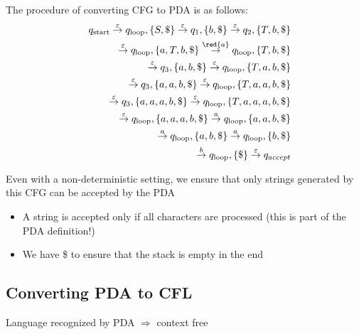 The procedure of converting CFG to PDA is as follows:
\begin{eqnarray*}
&& q_{\text{start}} \stackrel{\varepsilon}{\rightarrow}
q_{\text{loop}}, \{S,\$\} 
\stackrel{\varepsilon}{\rightarrow} q_1, \{b,\$\}
\stackrel{\varepsilon}{\rightarrow} q_2, \{T,b,\$\} \\
&& \stackrel{\varepsilon}{\rightarrow} q_{\text{loop}}, \{a,T,b,\$\} 
\stackrel{\red{a}}{\rightarrow}
 q_{\text{loop}}, \{T,b,\$\} \\
&& \stackrel{\varepsilon}{\rightarrow} q_{3}, \{a, b,\$\} 
\stackrel{\varepsilon}{\rightarrow} q_{\text{loop}}, \{T,a,b,\$\}\\
&& \stackrel{\varepsilon}{\rightarrow} q_3, \{a,a,b,\$\}
\stackrel{\varepsilon}{\rightarrow} q_{\text{loop}}, \{T,a,a,b,\$\}\\
&& \stackrel{\varepsilon}{\rightarrow} q_3, \{a,a,a,b,\$\}
\stackrel{\varepsilon}{\rightarrow} q_{\text{loop}}, \{T,a,a,a,b,\$\}\\
&& \stackrel{\varepsilon}{\rightarrow} q_{\text{loop}}, \{a,a,a,b,\$\}
\stackrel{a}{\rightarrow} q_{\text{loop}}, \{a,a,b,\$\}\\
&& \stackrel{a}{\rightarrow} q_{\text{loop}},\{a,b,\$\}
\stackrel{a}{\rightarrow} q_{\text{loop}}, \{b,\$\}\\
&& \stackrel{b}{\rightarrow} q_{\text{loop}}, \{\$\}
\stackrel{\varepsilon}{\rightarrow} q_{accept}
\end{eqnarray*}

\newpage

\begin{proposition}
    Even with a non-deterministic setting, we ensure that only strings generated by this CFG can be accepted by the PDA
    \begin{itemize}
        \item A string is accepted only if all characters are processed (this is part of the PDA definition!)
        \item We have \$ to ensure that the stack is empty in the end
    \end{itemize}
\end{proposition}

\subsection{Converting PDA to CFL}

\begin{lemma}
    Language recognized by PDA $\Longrightarrow$ context free
\end{lemma}

